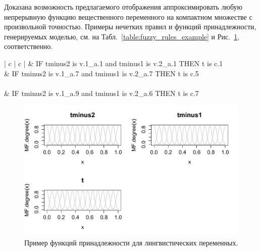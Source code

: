 Доказана возможность предлагаемого отображения аппроксимировать любую непрерывную функцию вещественного переменного на компактном множестве с произвольной точностью.
Примеры нечетких правил и функций принадлежности, генерируемых моделью, см. на
Табл.~\ref{table:fuzzy_rules_example} и Рис.~\ref{figure:MFexample}, соответственно.  

\renewcommand{\arraystretch}{1.5} %
\setlength{\tabcolsep}{8pt} %

\begin{table}[bhtp]
	\caption{Пример нечетких правил.}
	\begin{center}
		\begin{tabular}{ | c | c | }
			 & IF tminus2 is  v.1\_a.1 and tminus1 is  v.2\_a.1 THEN   t  is  c.1 \\
			 & IF tminus2 is  v.1\_a.7 and tminus1 is  v.2\_a.7 THEN   t  is  c.5  \\
			\hline
			 \\
			 & IF tminus2 is  v.1\_a.9 and tminus1 is  v.2\_a.6 THEN   t  is  c.7 \\
			\hline
		\end{tabular}		
	\end{center}
	\label{table:fuzzy_rules_example}	
\end{table}

\begin{figure}[bhtp]
	\begin{center}
		\includegraphics[scale=0.8]{images/MFexample.pdf}
		\caption{Пример функций принадлежности для лингвистических переменных.}		
		\label{figure:MFexample}
	\end{center}
\end{figure}

